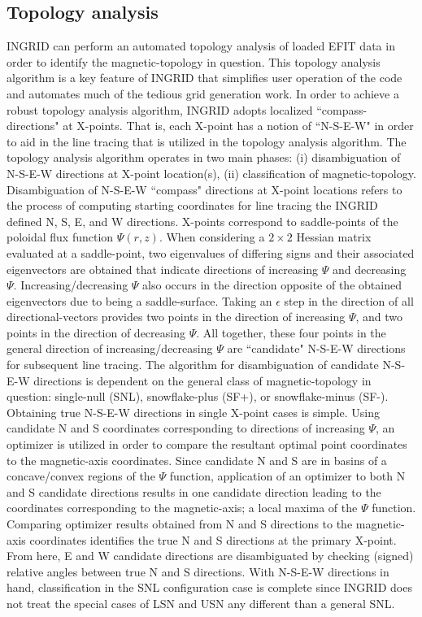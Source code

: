 \subsection{Topology analysis}
INGRID can perform an automated topology analysis of loaded EFIT data in order to identify the magnetic-topology in question. This topology analysis algorithm is a key feature of INGRID that simplifies user operation of the code and automates much of the tedious grid generation work. In order to achieve a robust topology analysis algorithm, INGRID adopts localized ``compass-directions" at X-points. That is, each X-point has a notion of ``N-S-E-W" in order to aid in the line tracing that is utilized in the topology analysis algorithm. The topology analysis algorithm operates in two main phases: (i) disambiguation of N-S-E-W directions at X-point location(s), (ii) classification of magnetic-topology.\\ \indent
Disambiguation of N-S-E-W ``compass" directions at X-point locations refers to the process of computing starting coordinates for line tracing the INGRID defined N, S, E, and W directions. X-points correspond to saddle-points of the poloidal flux function $\Psi(r,z)$. When considering a $2\times2$ Hessian matrix evaluated at a saddle-point, two eigenvalues of differing signs and their associated eigenvectors are obtained that indicate directions of increasing $\Psi$ and decreasing $\Psi$. Increasing/decreasing $\Psi$ also occurs in the direction opposite of the obtained eigenvectors due to being a saddle-surface. Taking an $\epsilon$ step in the direction of all directional-vectors provides two points in the direction of increasing $\Psi$, and two points in the direction of decreasing $\Psi$. All together, these four points in the general direction of increasing/decreasing $\Psi$ are ``candidate" N-S-E-W directions for subsequent line tracing. The algorithm for disambiguation of candidate N-S-E-W directions is dependent on the general class of magnetic-topology in question: single-null (SNL), snowflake-plus (SF+), or snowflake-minus (SF-).\\ \indent
Obtaining true N-S-E-W directions in single X-point cases is simple. Using candidate N and S coordinates corresponding to directions of increasing $\Psi$, an optimizer is utilized in order to compare the resultant optimal point coordinates to the magnetic-axis coordinates. Since candidate N and S are in basins of a concave/convex regions of the $\Psi$ function, application of an optimizer to both N and S candidate directions results in one candidate direction leading to the coordinates corresponding to the magnetic-axis; a local maxima of the $\Psi$ function. Comparing optimizer results obtained from N and S directions to the magnetic-axis coordinates identifies the true N and S directions at the primary X-point. From here, E and W candidate directions are disambiguated by checking (signed) relative angles between true N and S directions. With N-S-E-W directions in hand, classification in the SNL configuration case is complete since INGRID does not treat the special cases of LSN and USN any different than a general SNL.\\ \indent
